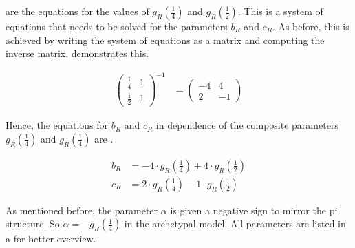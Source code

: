  are the equations for the values of $g_R\left(\frac{1}{4}\right)$ and $g_R\left(\frac{1}{2}\right)$.
This is a system of equations that needs to be solved for the parameters $b_R$ and $c_R$.
As before, this is achieved by writing the system of equations as a matrix and computing the inverse matrix.
 demonstrates this.

\begin{align}
	\begin{pmatrix}
		\frac{1}{4} & 1 \\
		\frac{1}{2} & 1
	\end{pmatrix}^{-1} & =
	\begin{pmatrix}
		-4 & 4  \\
		2  & -1
	\end{pmatrix}
	\label{equ:setup.arch.matrix}
\end{align}

Hence, the equations for $b_R$ and $c_R$ in dependence of the composite parameters $g_R\left(\frac{1}{4}\right)$ and $g_R\left(\frac{1}{4}\right)$ are .

\begin{align}
	b_R & = -4 \cdot g_R\left(\frac{1}{4}\right) + 4 \cdot g_R\left(\frac{1}{2}\right) \label{equ:setup.arch.bR} \\
	c_R & = 2 \cdot g_R\left(\frac{1}{4}\right) - 1 \cdot g_R\left(\frac{1}{2}\right) \label{equ:setup.arch.cR}
\end{align}



As mentioned before, the parameter $\alpha$ is given a negative sign to mirror the \gls{pi} structure.
So $\alpha = -g_R\left(\frac{1}{4}\right)$ in the archetypal model.
All parameters are listed in  a for better overview.

